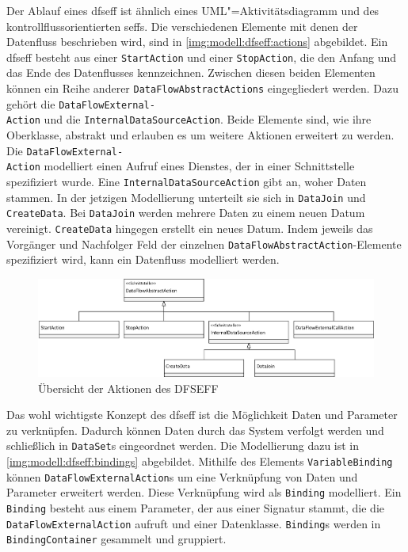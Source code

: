 Der Ablauf eines \gls{dfseff} ist ähnlich eines UML"=Aktivitätsdiagramm und des kontrollflussorientierten \gls{seff}s. Die verschiedenen Elemente mit denen der Datenfluss beschrieben wird, sind in \autoref{img:modell:dfseff:actions} abgebildet. Ein \gls{dfseff} besteht aus einer \texttt{StartAction} und einer \texttt{StopAction}, die den Anfang und das Ende des Datenflusses kennzeichnen. Zwischen diesen beiden Elementen können ein Reihe anderer \texttt{DataFlowAbstractActions} eingegliedert werden. Dazu gehört die \texttt{DataFlowExternal-\\Action} und die \texttt{InternalDataSourceAction}. Beide Elemente sind, wie ihre Oberklasse, abstrakt und erlauben es um weitere Aktionen erweitert zu werden. Die \texttt{DataFlowExternal-\\Action} modelliert einen Aufruf eines Dienstes, der in einer Schnittstelle spezifiziert wurde. Eine \texttt{InternalDataSourceAction} gibt an, woher Daten stammen. In der jetzigen Modellierung unterteilt sie sich in \texttt{DataJoin} und \texttt{CreateData}. Bei \texttt{DataJoin} werden mehrere Daten zu einem neuen Datum vereinigt. \texttt{CreateData} hingegen erstellt ein neues Datum. Indem jeweils das Vorgänger und Nachfolger Feld der einzelnen \texttt{DataFlowAbstractAction}-Elemente spezifiziert wird, kann ein Datenfluss modelliert werden. \par
\begin{figure}[h]
	\centering
  	\includegraphics[width=1\textwidth]{images/meta_dfseff_actions.png}
	\caption{Übersicht der Aktionen des DFSEFF}
	\label{img:modell:dfseff:actions}
\end{figure}
Das wohl wichtigste Konzept des \gls{dfseff} ist die Möglichkeit Daten und Parameter zu verknüpfen. Dadurch können Daten durch das System verfolgt werden und schließlich in \texttt{DataSet}s eingeordnet werden. Die Modellierung dazu ist in \autoref{img:modell:dfseff:bindings} abgebildet. Mithilfe des Elements \texttt{VariableBinding} können \texttt{DataFlowExternalAction}s um eine Verknüpfung von Daten und Parameter erweitert werden. Diese Verknüpfung wird als \texttt{Binding} modelliert. Ein \texttt{Binding} besteht aus einem Parameter, der aus einer Signatur stammt, die die \texttt{DataFlowExternalAction} aufruft und einer Datenklasse. \texttt{Binding}s werden in \texttt{BindingContainer} gesammelt und gruppiert. \par
